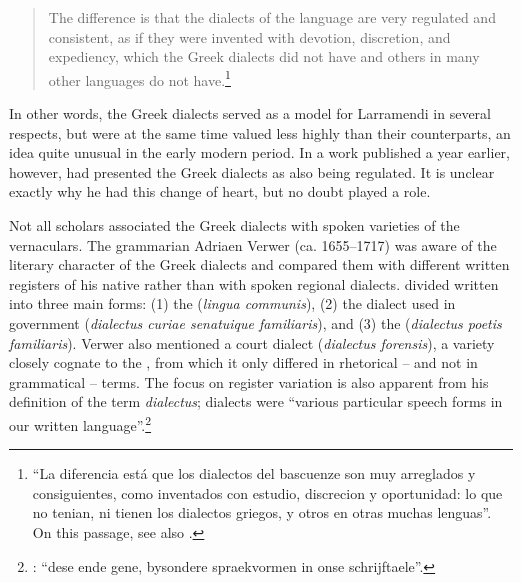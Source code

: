 \begin{quote}
The difference is that the dialects of the  language are very regulated and consistent, as if they were invented with devotion, discretion, and expediency, which the Greek dialects did not have and others in many other languages do not have.\footnote{“La diferencia está que los dialectos del bascuenze son muy arreglados y consiguientes, como inventados con estudio, discrecion y oportunidad: lo que no tenian, ni tienen los dialectos griegos, y otros en otras muchas lenguas”. On this passage, see also \citet[876]{Hasler2009}.}
\end{quote}

In other words, the Greek dialects served as a model for Larramendi in several respects, but were at the same time valued less highly than their  counterparts, an idea quite unusual in the early modern period. In a work published a year earlier, however, \citet[142]{Larramendi1728} had presented the Greek dialects as also being regulated. It is unclear exactly why he had this change of heart, but  no doubt played a role.

Not all scholars associated the Greek dialects with spoken varieties of the vernaculars. The  grammarian Adriaen Verwer (ca. 1655–1717) was aware of the literary character of the Greek dialects and compared them with different written registers of his native  rather than with spoken regional dialects. \citet[53--54]{Verwer1707} divided written  into three main forms: (1) the  (\textit{lingua communis}), (2) the dialect used in government (\textit{dialectus curiae senatuique familiaris}), and (3) the  (\textit{dialectus poetis familiaris}). Verwer also mentioned a court dialect (\textit{dialectus forensis}), a variety closely cognate to the , from which it only differed in rhetorical – and not in grammatical – terms. The focus on register variation is also apparent from his definition of the  term \textit{dialectus}; dialects were “various particular speech forms in our written language”.\footnote{\citet[53]{Verwer1707}: “dese ende gene, bysondere spraekvormen in onse schrijftaele”.}

